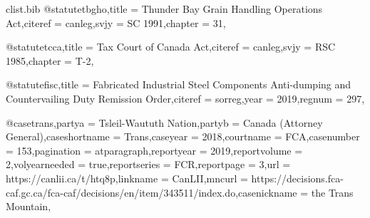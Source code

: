 \begin{filecontents*}[overwrite]{clist\jobname.bib}
@statute{tbgho,title =  {Thunder Bay Grain Handling Operations Act},citeref =  {canleg},svjy =  {SC 1991},chapter =  {31},}

@statute{tcca,title =  {Tax Court of Canada Act},citeref =  {canleg},svjy =  {RSC 1985},chapter =  {T-2},}

@statute{fisc,title =  {Fabricated Industrial Steel Components Anti-dumping and Countervailing Duty Remission Order},citeref =  {sorreg},year =  {2019},regnum =  {297},}

@case{trans,partya =  {Tsleil-Waututh Nation},partyb =  {Canada (Attorney General)},caseshortname =  {Trans},caseyear =  {2018},courtname =  {FCA},casenumber =  {153},pagination =  {atparagraph},reportyear =  {2019},reportvolume =  {2},volyearneeded =  {true},reportseries =  {FCR},reportpage =  {3},url =  {https://canlii.ca/t/htq8p},linkname =  {CanLII},mncurl =  {https://decisions.fca-caf.gc.ca/fca-caf/decisions/en/item/343511/index.do},casenickname =  {the Trans Mountain},}


\end{filecontents*}
